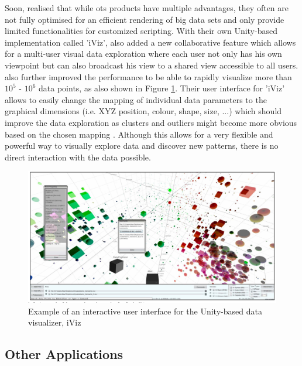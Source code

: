 Soon, \cite{Donalek2014} realised that while \gls{ots} products have multiple advantages, they often are not fully optimised for an efficient rendering of big data sets and only provide limited functionalities for customized scripting. With their own Unity-based implementation called 'iViz', \cite{Donalek2014} also added a new collaborative feature which allows for a multi-user visual data exploration where each user not only has his own viewpoint but can also broadcast his view to a shared view accessible to all users. \cite{Donalek2014} also further improved the performance to be able to rapidly visualize more than $10^{5}$ - $10^{6}$ data points, as also shown in Figure \ref{fig:iviz}. Their user interface for 'iViz' allows to easily change the mapping of individual data parameters to the graphical dimensions (i.e. XYZ position, colour, shape, size, ...) which should improve the data exploration as clusters and outliers might become more obvious based on the chosen mapping \citep{Donalek2014}. Although this allows for a very flexible and powerful way to visually explore data and discover new patterns, there is no direct interaction with the data possible.
\begin{figure}[h]
	\begin{center}
		\includegraphics[width=14cm]{03_Figures/05_LitReview/Donalek2014_iViz.png}
		\caption[Example of an interactive user interface for the Unity-based data visualizer, iViz]{Example of an interactive user interface for the Unity-based data visualizer, iViz \citep{Donalek2014}}
		\label{fig:iviz}
	\end{center}
\end{figure}




\subsection{Other Applications}

